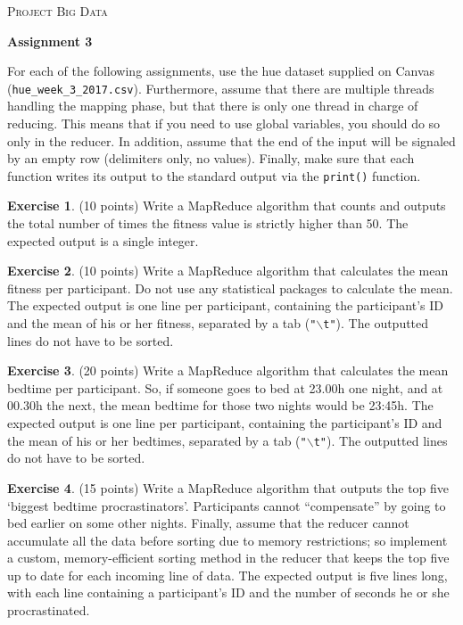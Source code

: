 \documentclass[a4paper]{report}
\theoremstyle{definition}
\newtheorem{exercise}{Exercise}
\newcommand{\blankline}{\par\vspace{5mm}}
\newcommand{\doublequote}{\texttt{"}}
\begin{document}
	
	\begin{center}
		\textsc{\Large Project Big Data}
		\blankline
		
		\textbf{\large Assignment 3}
	\end{center}
	
	\noindent For each of the following assignments, use the hue dataset supplied on Canvas (\texttt{\small hue\_week\_3\_2017.csv}). Furthermore, assume	that there are multiple threads handling the mapping phase, but that there is only one thread in charge of reducing. This means that if you need to use global variables, you should do so only in the reducer. In addition, assume that the end of the input will be signaled by an empty row (delimiters only, no values). Finally, make sure that each function writes its output to the standard output via the \texttt{\small print()} function.
	
	\begin{exercise}
		(10 points) Write a MapReduce algorithm that counts and outputs the total number of times the fitness value is strictly higher than 50. The expected output is a single integer.
	\end{exercise}
	
	\begin{exercise}
		(10 points) Write a MapReduce algorithm that calculates the mean fitness per participant. Do not use any statistical packages to calculate the mean. The expected output is one line per participant, containing the participant’s ID and the mean of his or her fitness, separated by a tab (\texttt{\doublequote{}$\backslash{}$t\doublequote{}}). The outputted lines do not have to be sorted.
	\end{exercise}
	
	\begin{exercise}
		(20 points) Write a MapReduce algorithm that calculates the mean bedtime per participant. So, if someone goes to bed at 23.00h one night, and at 00.30h the next, the mean bedtime for those two nights would be 23:45h. The expected output is one line per participant, containing the participant’s ID and the mean of his or her bedtimes, separated by a tab (\texttt{\doublequote{}$\backslash{}$t\doublequote{}}). The outputted lines do not have to be sorted.
	\end{exercise}
	
	\begin{exercise}
		(15 points) Write a MapReduce algorithm that outputs the top five ‘biggest bedtime procrastinators’. Participants cannot “compensate” by going to bed earlier on some other nights. Finally, assume that the reducer cannot accumulate all the data before sorting due to memory restrictions; so implement a custom, memory-efficient sorting method in the reducer that keeps the top five up to date for each incoming line of data. The expected output is five lines long, with each line containing a participant’s ID and the number of seconds he or she procrastinated.
	\end{exercise}
	
\end{document}
